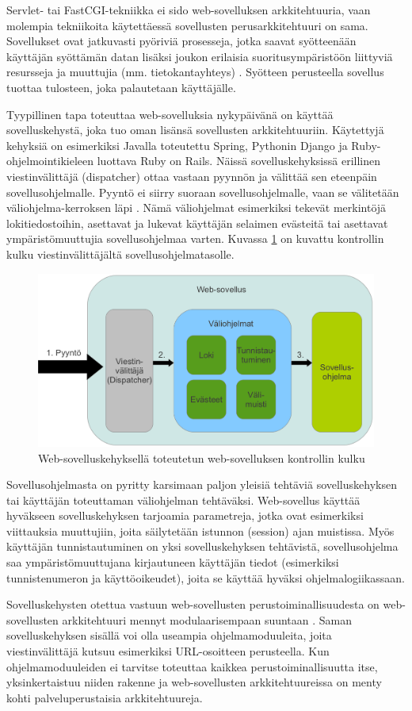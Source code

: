 Servlet- tai FastCGI-tekniikka ei sido web-sovelluksen arkkitehtuuria, vaan molempia tekniikoita käytettäessä sovellusten perusarkkitehtuuri on sama. Sovellukset ovat jatkuvasti pyöriviä prosesseja, jotka saavat syötteenään käyttäjän syöttämän datan lisäksi joukon erilaisia suoritusympäristöön liittyviä resursseja ja muuttujia (mm. tietokantayhteys) \cite{uml}. Syötteen perusteella sovellus tuottaa tulosteen, joka palautetaan käyttäjälle.

Tyypillinen tapa toteuttaa web-sovelluksia nykypäivänä on käyttää sovelluskehystä, joka tuo oman lisänsä sovellusten arkkitehtuuriin. Käytettyjä kehyksiä on esimerkiksi Javalla toteutettu Spring, Pythonin Django ja Ruby-ohjelmointikieleen luottava Ruby on Rails. Näissä sovelluskehyksissä erillinen viestinvälittäjä (dispatcher) ottaa vastaan pyynnön ja välittää sen eteenpäin sovellusohjelmalle. Pyyntö ei siirry suoraan sovellusohjelmalle, vaan se välitetään väliohjelma-kerroksen läpi \cite{ruby2011agile}. Nämä väliohjelmat esimerkiksi tekevät merkintöjä lokitiedostoihin, asettavat ja lukevat käyttäjän selaimen evästeitä tai asettavat ympäristömuuttujia sovellusohjelmaa varten. Kuvassa \ref{dispatcher} on kuvattu kontrollin kulku viestinvälittäjältä sovellusohjelmatasolle.

\begin{figure}[ht]
\centering
\includegraphics[width=\textwidth]{web/dispatcher.eps}
\caption{Web-sovelluskehyksellä toteutetun web-sovelluksen kontrollin kulku}%
\label{dispatcher}
\end{figure}

Sovellusohjelmasta on pyritty karsimaan paljon yleisiä tehtäviä sovelluskehyksen tai käyttäjän toteuttaman väliohjelman tehtäväksi. Web-sovellus käyttää hyväkseen sovelluskehyksen tarjoamia parametreja, jotka ovat esimerkiksi viittauksia muuttujiin, joita säilytetään istunnon (session) ajan muistissa. Myös käyttäjän tunnistautuminen on yksi sovelluskehyksen tehtävistä, sovellusohjelma saa ympäristömuuttujana kirjautuneen käyttäjän tiedot (esimerkiksi tunnistenumeron ja käyttöoikeudet), joita se käyttää hyväksi ohjelmalogiikassaan.

Sovelluskehysten otettua vastuun web-sovellusten perustoiminallisuudesta on web-sovellusten arkkitehtuuri mennyt modulaarisempaan suuntaan \cite{ruby2011agile}. Saman sovelluskehyksen sisällä voi olla useampia ohjelmamoduuleita, joita viestinvälittäjä kutsuu esimerkiksi URL-osoitteen perusteella. Kun ohjelmamoduuleiden ei tarvitse toteuttaa kaikkea perustoiminallisuutta itse, yksinkertaistuu niiden rakenne ja web-sovellusten arkkitehtuureissa on menty kohti palveluperustaisia arkkitehtuureja.